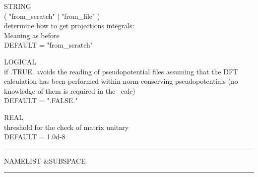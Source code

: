 {\noindent{}%
STRING \\ ( "from\_scratch" $\mid$ "from\_file" )\\
determine how to get projections integrals:\\
Meaning as before\\ DEFAULT = "from\_scratch" \par

\noindent{}%
LOGICAL \\ if .TRUE. avoids the reading of pseudopotential files
assuming that the DFT calculation has been performed within norm-conserving
pseudopotentials (no knowledge of them is required in the \WANT\ calc)\\ DEFAULT = ".FALSE." \par

\noindent{}%
REAL \\ threshold for the check of matrix unitary\\ DEFAULT = 1.0d-8 \par
}\bigskip

\begin{centering}
\rule{2.2in}{0.01in} NAMELIST \&SUBSPACE \rule{2.2in}{0.01in}
\end{centering}\\

